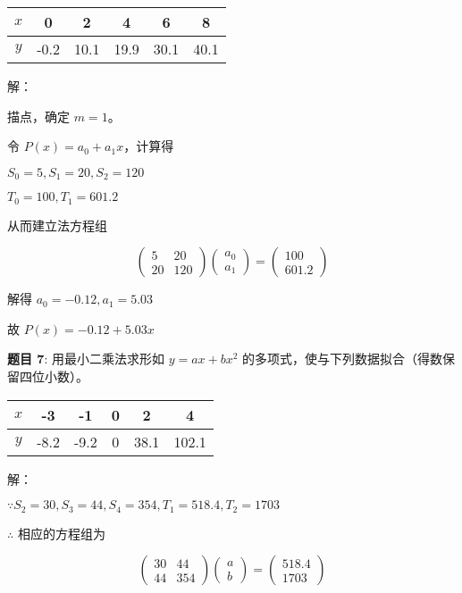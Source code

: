\documentclass{article}
\begin{document}
\begin{center}
    \begin{tabular}{|c|c|c|c|c|c|}
        \hline
        $x$ & 0 & 2 & 4 & 6 & 8 \\
        \hline
        $y$ & -0.2 & 10.1 & 19.9 & 30.1 & 40.1 \\
        \hline
    \end{tabular}
\end{center}

\noindent 解：

描点，确定 $m = 1$。

令 $P(x) = a_0 + a_1x$，计算得 

$S_0 = 5, S_1 = 20, S_2 = 120$

$T_0 = 100, T_1 = 601.2$

从而建立法方程组

$$
\begin{pmatrix}
    5 & 20 \\
    20 & 120
\end{pmatrix}
\begin{pmatrix}
    a_0 \\
    a_1
\end{pmatrix}
=
\begin{pmatrix}
    100 \\
    601.2
\end{pmatrix}
$$

解得 $a_0 = -0.12, a_1 = 5.03$

故 $P(x) = -0.12 + 5.03x$

\noindent\textbf{题目 7}: 用最小二乘法求形如 $y = ax + bx^2$ 的多项式，使与下列数据拟合（得数保留四位小数）。

\begin{center}
    \begin{tabular}{|c|c|c|c|c|c|}
        \hline
        $x$ & -3 & -1 & 0 & 2 & 4 \\
        \hline
        $y$ & -8.2 & -9.2 & 0 & 38.1 & 102.1 \\
        \hline
    \end{tabular}
\end{center}

\noindent 解：

$\because S_2 = 30, S_3 = 44, S_4 = 354, T_1 = 518.4, T_2 = 1703$

$\therefore$ 相应的方程组为

$$
\begin{pmatrix}
    30 & 44 \\
    44 & 354
\end{pmatrix}
\begin{pmatrix}
    a \\
    b
\end{pmatrix}
=
\begin{pmatrix}
    518.4 \\
    1703
\end{pmatrix}
$$
\end{document}
